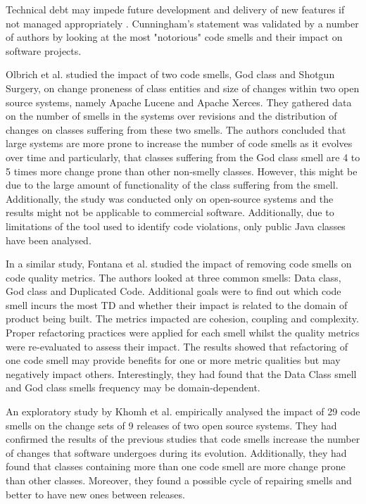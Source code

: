\documentclass{mprop}
\begin{document}

Technical debt may impede future development and delivery of new features if not
managed appropriately \cite{Cunningham1993}. Cunningham's statement was
validated by a number of authors by looking at the most "notorious" code smells
\cite{Fowler1999} and their impact on software projects.

Olbrich et al. \cite{Olbrich2009} studied the impact of two code smells, God
class and Shotgun Surgery, on change proneness of class entities and size of
changes within two open source systems, namely Apache Lucene and Apache Xerces.
They gathered data on the number of smells in the systems over revisions and the
distribution of changes on classes suffering from these two smells. The authors
concluded that large systems are more prone to increase the number of code
smells as it evolves over time and particularly, that classes suffering from the
God class smell are 4 to 5 times more change prone than other non-smelly
classes. However, this might be due to the large amount of functionality of the
class suffering from the smell. Additionally, the study was conducted only on
open-source systems and the results might not be applicable to commercial
software. Additionally, due to limitations of the tool used to identify code
violations, only public Java classes have been analysed.

In a similar study, Fontana et al. \cite{Fontana2012} studied the impact of
removing code smells on code quality metrics. The authors looked at three common
smells: Data class, God class and Duplicated Code. Additional goals were to find
out which code smell incurs the most TD and whether their impact is related to
the domain of product being built. The metrics impacted are cohesion, coupling
and complexity. Proper refactoring practices were applied for each smell whilst
the quality metrics were re-evaluated to assess their impact. The results showed
that refactoring of one code smell may provide benefits for one or more metric
qualities but may negatively impact others. Interestingly, they had found that
the Data Class smell and God class smells frequency may be domain-dependent.

An exploratory study by Khomh et al. \cite{Khomh2009} empirically analysed the
impact of 29 code smells on the change sets of 9 releases of two open source
systems. They had confirmed the results of the previous studies that code smells
increase the number of changes that software undergoes during its evolution.
Additionally, they had found that classes containing more than one code smell
are more change prone than other classes. Moreover, they found a possible cycle
of repairing smells and better to have new ones between releases.
\end{document}
